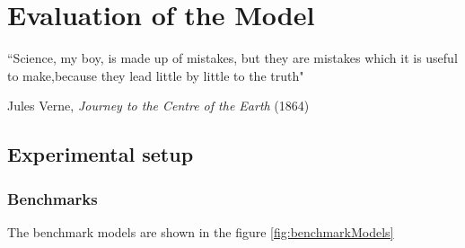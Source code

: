 
\chapter{Evaluation of the Model} %

\label{Chapter5} %


``Science, my boy, is made up of mistakes, but they are mistakes which it is useful to make,because
they lead little by little to the truth"

\begin{flushright}
Jules Verne, \textit{Journey to the Centre of the Earth} (1864)
\end{flushright}


\section{Experimental setup}


\subsection{Benchmarks}
The benchmark models are shown in the figure \ref{fig:benchmarkModels}

